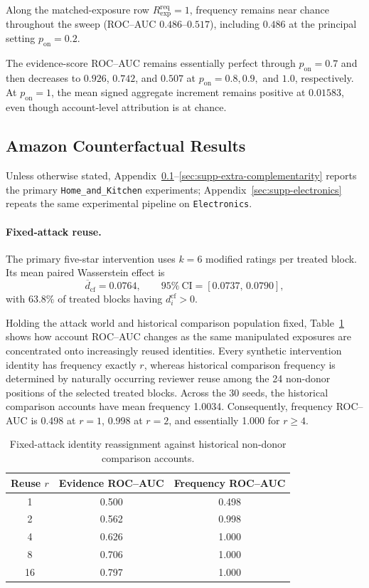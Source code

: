 Along the matched-exposure row
$R_{\mathrm{exp}}^{\mathrm{req}}=1$, frequency remains near chance throughout
the sweep (ROC--AUC $0.486$--$0.517$), including $0.486$ at the principal
setting $p_{\mathrm{on}}=0.2$.

The evidence-score ROC--AUC remains essentially perfect through
$p_{\mathrm{on}}=0.7$ and then decreases to $0.926$, $0.742$, and $0.507$
at $p_{\mathrm{on}}=0.8,0.9,$ and $1.0$, respectively. At
$p_{\mathrm{on}}=1$, the mean signed aggregate increment remains positive
at $0.01583$, even though account-level attribution is at chance.

\subsection{Amazon Counterfactual Results}
\label{sec:supp-extra-amazon}
Unless otherwise stated,
Appendix~\ref{sec:supp-extra-amazon}--\ref{sec:supp-extra-complementarity}
reports the primary \texttt{Home\_and\_Kitchen} experiments;
Appendix~\ref{sec:supp-electronics} repeats the same
experimental pipeline on \texttt{Electronics}.

\paragraph{Fixed-attack reuse.}
The primary five-star intervention uses $k=6$ modified ratings per treated
block. Its mean paired Wasserstein effect is
\[
\overline d_{\mathrm{cf}}
=
0.0764,
\qquad
95\%~\mathrm{CI}
=
[0.0737,\,0.0790],
\]
with $63.8\%$ of treated blocks having $d_i^{\mathrm{cf}}>0$.

Holding the attack world and historical comparison population fixed,
Table~\ref{tab:supp-reuse-results} shows how account ROC--AUC changes as the
same manipulated exposures are concentrated onto increasingly reused
identities. Every synthetic
intervention identity has frequency exactly $r$, whereas historical
comparison frequency is determined by naturally occurring reviewer reuse
among the 24 non-donor positions of the selected treated blocks. Across the
30 seeds, the historical comparison accounts have mean frequency 1.0034.
Consequently, frequency ROC--AUC is 0.498 at $r=1$, 0.998 at $r=2$, and
essentially 1.000 for $r\geq4$.

\begin{table}[t]
\caption{Fixed-attack identity reassignment against historical non-donor
comparison accounts.}
\label{tab:supp-reuse-results}
\centering
\small
\begin{tabular}{@{}ccc@{}}
\toprule
Reuse $r$ & Evidence ROC--AUC & Frequency ROC--AUC \\
\midrule
1  & 0.500 & 0.498 \\
2  & 0.562 & 0.998 \\
4  & 0.626 & 1.000 \\
8  & 0.706 & 1.000 \\
16 & 0.797 & 1.000 \\
\bottomrule
\end{tabular}
\end{table}

